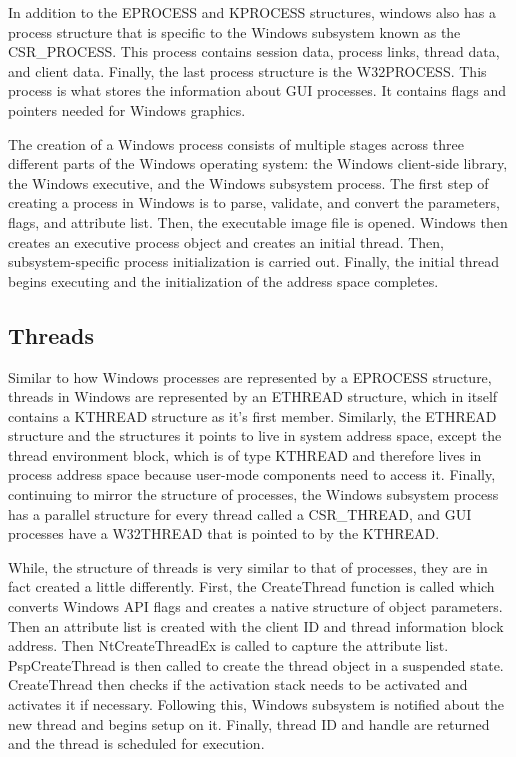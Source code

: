 \documentclass[journal,letterpaper,draftclsnofoot,onecolumn,10pt]{IEEEtran}
\begin{document}
In addition to the EPROCESS and KPROCESS structures, windows also has a process structure that is specific to the Windows subsystem known as the CSR\_PROCESS. This process contains session data, process links, thread data, and client data. Finally, the last process structure is the W32PROCESS. This process is what stores the information about GUI processes. It contains flags and pointers needed for Windows graphics.\cite{1ris12}

The creation of a Windows process consists of multiple stages across three different parts of the Windows operating system: the Windows client-side library, the Windows executive, and the Windows subsystem process. The first step of creating a process in Windows is to parse, validate, and convert the parameters, flags, and attribute list. Then, the executable image file is opened. Windows then creates an executive process object and creates an initial thread. Then, subsystem-specific process initialization is carried out. Finally, the initial thread begins executing and the initialization of the address space completes.\cite{1ris12}
\subsection{Threads}
Similar to how Windows processes are represented by a EPROCESS structure, threads in Windows are represented by an ETHREAD structure, which in itself contains a KTHREAD structure as it's first member. Similarly, the ETHREAD structure and the structures it points to live in system address space, except the thread environment block, which is of type KTHREAD and therefore lives in process address space because user-mode components need to access it. Finally, continuing to mirror the structure of processes, the Windows subsystem process has a parallel structure for every thread called a CSR\_THREAD, and GUI processes have a W32THREAD that is pointed to by the KTHREAD.\cite{1ris12}

While, the structure of threads is very similar to that of processes, they are in fact created a little differently. First, the CreateThread function is called which converts Windows API flags and creates a native structure of object parameters. Then an attribute list is created with the client ID and thread information block address. Then NtCreateThreadEx is called to capture the attribute list. PspCreateThread is then called to create the thread object in a suspended state. CreateThread then checks if the activation stack needs to be activated and activates it if necessary. Following this, Windows subsystem is notified about the new thread and begins setup on it. Finally, thread ID and handle are returned and the thread is scheduled for execution.\cite{1ris12}
\end{document}
